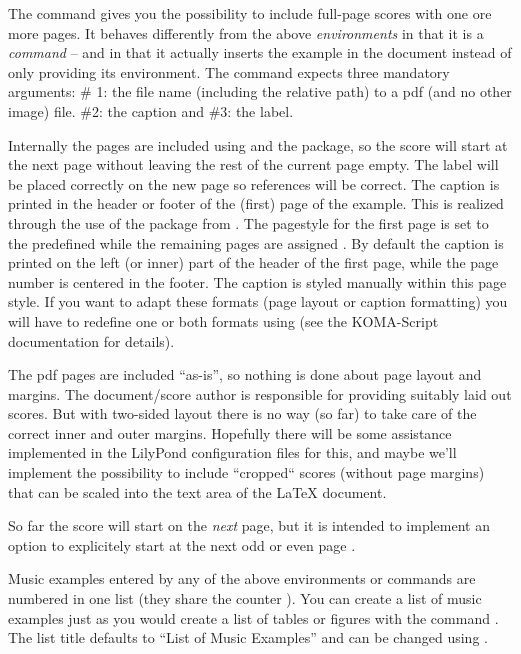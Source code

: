 \documentclass{OLLbook}
\begin{document}
The  command gives you the possibility to include full-page scores with one ore more pages.
It behaves differently from the above \emph{environments} in that it is a \emph{command} -- and in that it actually inserts the example in the document instead of only providing its environment.
The command expects three mandatory arguments: 
\# 1: the file name (including the relative path) to a pdf (and no other image) file.
\#2: the caption and \#3: the label.

Internally the pages are included using  and the  package, so the score will start at the next page without leaving the rest of the current page empty.
The label will be placed correctly on the new page so references will be correct.
The caption is printed in the header or footer of the (first) page of the example.
This is realized through the use of the  package from .
The pagestyle for the first page is set to the predefined  while the remaining pages are assigned .
By default the caption is printed on the left (or inner) part of the header of the first page, while the page number is centered in the footer.
The caption is styled manually within this page style.
If you want to adapt these formats (page layout or caption formatting) you will have to redefine one or both formats using  (see the KOMA-Script documentation for details).
\begin{knownIssues}
The pdf pages are included “as-is”, so nothing is done about page layout and margins.
The document/score author is responsible for providing suitably laid out scores.
But with two-sided layout there is no way (so far) to take care of the correct inner and outer margins.
Hopefully there will be some assistance implemented in the LilyPond configuration files for this, and maybe we'll implement the possibility to include “cropped“ scores (without page margins) that can be scaled into the text area of the \LaTeX{} document.

So far the score will start on the \emph{next} page, but it is intended to implement an option to explicitely start at the next odd or even page .
\end{knownIssues}

\bigskip
Music examples entered by any of the above environments or commands are numbered in one list (they share the counter ).
You can create a list of music examples just as you would create a list of tables or figures with the command .
The list title defaults to “List of Music Examples” and can be changed using .
\end{document}
